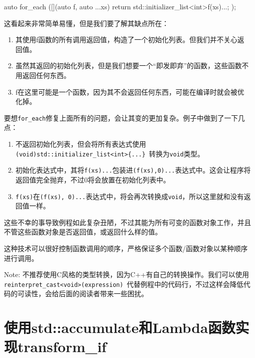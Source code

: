 \begin{codebox}[cpp]
auto for_each ([](auto f, auto ...xs) {
    return std::initializer_list<int>{f(xs)...};
});
\end{codebox}

这看起来非常简单易懂，但是我们要了解其缺点所在：

\begin{enumerate}
\item 其使用f函数的所有调用返回值，构造了一个初始化列表。但我们并不关心返回值。

\item 虽然其返回的初始化列表，但是我们想要一个“即发即弃”的函数，这些函数不用返回任何东西。

\item f在这里可能是一个函数，因为其不会返回任何东西，可能在编译时就会被优化掉。

\end{enumerate}

要想\texttt{for\_each}修复上面所有的问题，会让其变的更加复杂。例子中做到了一下几点：

\begin{enumerate}
\item 不返回初始化列表，但会将所有表达式使用\texttt{ (void)std::initializer\_list<int>\{...\} }转换为\texttt{void}类型。

\item 初始化表达式中，其将\texttt{f(xs)...}包装进\texttt{(f(xs),0)...}表达式中。这会让程序将返回值完全抛弃，不过0将会放置在初始化列表中。

\item \texttt{f(xs)}在\texttt{(f(xs), 0)...}表达式中，将会再次转换成\texttt{void}，所以这里就和没有返回值一样。

\end{enumerate}

这些不幸的事导致例程如此复杂丑陋，不过其能为所有可变的函数对象工作，并且不管这些函数对象是否返回值，或返回什么样的值。

这种技术可以很好控制函数调用的顺序，严格保证多个函数/函数对象以某种顺序进行调用。

\begin{myInfoBox}
Note: 不推荐使用C风格的类型转换，因为C++有自己的转换操作。我们可以使用\texttt{reinterpret\_cast<void>(expression) }代替例程中的代码行，不过这样会降低代码的可读性，会给后面的阅读者带来一些困扰。
\end{myInfoBox}


\section{使用std::accumulate和Lambda函数实现transform\_if}

